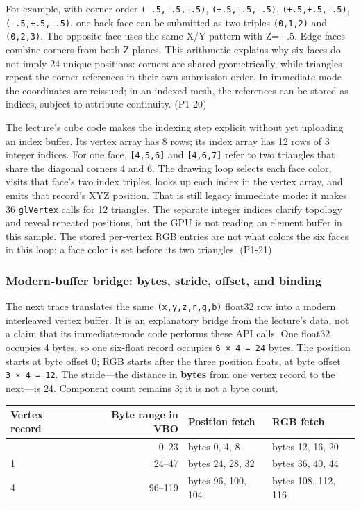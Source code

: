 For example, with corner order \texttt{(-.5,-.5,-.5)}, \texttt{(+.5,-.5,-.5)}, \texttt{(+.5,+.5,-.5)}, \texttt{(-.5,+.5,-.5)}, one back face can be submitted as two triples \texttt{(0,1,2)} and \texttt{(0,2,3)}. The opposite face uses the same X/Y pattern with Z=+.5. Edge faces combine corners from both Z planes. This arithmetic explains why six faces do not imply 24 unique positions: corners are shared geometrically, while triangles repeat the corner references in their own submission order. In immediate mode the coordinates are reissued; in an indexed mesh, the references can be stored as indices, subject to attribute continuity. (P1-20)

The lecture's cube code makes the indexing step explicit without yet uploading an index buffer. Its vertex array has 8 rows; its index array has 12 rows of 3 integer indices. For one face, \texttt{{[}4,5,6{]}} and \texttt{{[}4,6,7{]}} refer to two triangles that share the diagonal corners 4 and 6. The drawing loop selects each face color, visits that face's two index triples, looks up each index in the vertex array, and emits that record's XYZ position. That is still legacy immediate mode: it makes 36 \texttt{glVertex} calls for 12 triangles. The separate integer indices clarify topology and reveal repeated positions, but the GPU is not reading an element buffer in this sample. The stored per-vertex RGB entries are not what colors the six faces in this loop; a face color is set before its two triangles. (P1-21)

\subsubsection{Modern-buffer bridge: bytes, stride, offset, and binding}\label{03-visual-computing-i-ch018-modern-buffer-bridge-bytes-stride-offset-and-binding}

The next trace translates the same \texttt{(x,y,z,r,g,b)} float32 row into a modern interleaved vertex buffer. It is an explanatory bridge from the lecture's data, not a claim that its immediate-mode code performs these API calls. One float32 occupies 4 bytes, so one six-float record occupies \texttt{6\ ×\ 4\ =\ 24} bytes. The position starts at byte offset 0; RGB starts after the three position floats, at byte offset \texttt{3\ ×\ 4\ =\ 12}. The stride---the distance in \textbf{bytes} from one vertex record to the next---is 24. Component count remains 3; it is not a byte count.

{\def\LTcaptype{none} %
\begin{longtable}[]{@{}lrll@{}}
\toprule\noalign{}
Vertex record & Byte range in VBO & Position fetch & RGB fetch \\
\midrule\noalign{}
\endhead
\bottomrule\noalign{}
\endlastfoot
0 & 0--23 & bytes 0, 4, 8 & bytes 12, 16, 20 \\
1 & 24--47 & bytes 24, 28, 32 & bytes 36, 40, 44 \\
4 & 96--119 & bytes 96, 100, 104 & bytes 108, 112, 116 \\
\end{longtable}
}

